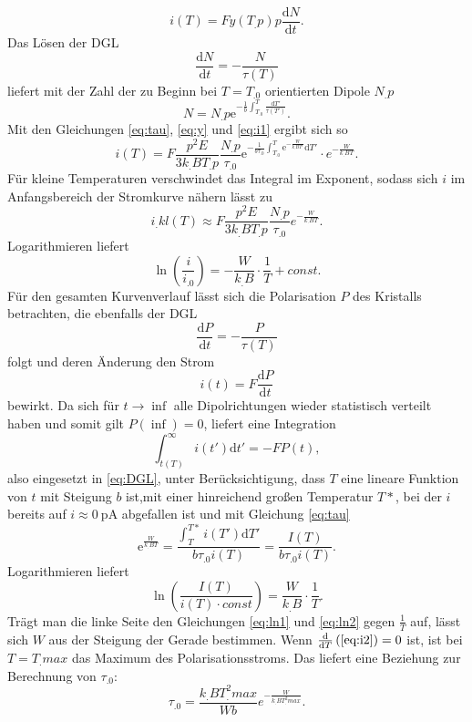 \begin{equation}
i(T)=F y(T_.p)p\frac{\mathrm{d}N}{\mathrm{d}t}\text{.}\label{eq:i1}
\end{equation}
Das Lösen der DGL
\[
\frac{\mathrm{d}N}{\mathrm{d}t}=-\frac{N}{\tau(T)}
\]
liefert mit der Zahl der zu Beginn bei $T=T_.0$ orientierten Dipole $N_.p$
\begin{equation}
N=N_.p\mathrm{e}^{-\frac{1}{b}\int_{T_.0}^T\frac{\mathrm{d}T'}{\tau(T')}}\text{.}\label{eq:N}
\end{equation}
Mit den Gleichungen \eqref{eq:tau}, \eqref{eq:y} und \eqref{eq:i1} ergibt sich so
\begin{equation}
i(T)=F\frac{p^2E}{3k_.BT_.p}\frac{N_.p}{\tau_.0}\mathrm{e}^{-\frac{1}{b\tau_.0}\int_{T_.0}^T\mathrm{e}^{-\frac{W}{k_.BT'}}\mathrm{d}T'}\cdot e^{-\frac{W}{k_.BT}}\text{.}\label{eq:i2}
\end{equation}
Für kleine Temperaturen verschwindet das Integral im Exponent, sodass sich $i$ im Anfangsbereich der Stromkurve nähern lässt zu
\begin{equation}
i_.{kl}(T)\approx F\frac{p^2E}{3k_.BT_.p}\frac{N_.p}{\tau_.0}e^{-\frac{W}{k_.BT}}\text{.}\label{eq:i_kl}
\end{equation}
Logarithmieren liefert 
\begin{equation}
\ln\left(\frac{i}{i_.0}\right)=-\frac{W}{k_.B}\cdot\frac{1}{T}+const\text{.}\label{eq:ln1}
\end{equation}
Für den gesamten Kurvenverlauf lässt sich die Polarisation $P$ des Kristalls betrachten, die ebenfalls der DGL
\begin{equation}
\frac{\mathrm{d}P}{\mathrm{d}t}=-\frac{P}{\tau(T)}\label{eq:DGL}
\end{equation}
folgt und deren Änderung den Strom
\[
i(t)=F\frac{\mathrm{d}P}{\mathrm{d}t}
\]
bewirkt. Da sich für $t\rightarrow\inf$ alle Dipolrichtungen wieder statistisch verteilt haben und somit gilt $P(\inf)=0$, liefert eine Integration
\[
\int_{t(T)}^{\infty}i(t')\mathrm{d}t'=-F P(t),
\]
also eingesetzt in \eqref{eq:DGL}, unter Berücksichtigung, dass $T$ eine lineare Funktion von $t$ mit Steigung $b$ ist,mit einer hinreichend großen Temperatur $T*$, bei der $i$ bereits auf $i\approx\SI{0}{\pico\ampere}$ abgefallen ist und mit Gleichung \eqref{eq:tau}
\begin{equation}
\mathrm{e}^{\frac{W}{k_.BT}}=\frac{\int_{T}^{T*}i(T')\mathrm{d}T'}{b\tau_.0 i(T)}=\frac{I(T)}{b\tau_.0 i(T)}\text{.}\label{eq:i3}
\end{equation}
Logarithmieren liefert
\begin{equation}
\ln\left(\frac{I(T)}{i(T)\cdot const}\right)=\frac{W}{k_.B}\cdot\frac{1}{T}\text{.}\label{eq:ln2}
\end{equation}
Trägt man die linke Seite den Gleichungen \eqref{eq:ln1} und \eqref{eq:ln2} gegen $\frac{1}{T}$ auf, lässt sich $W$ aus der Steigung der Gerade bestimmen.
Wenn $\frac{\mathrm{d}}{\mathrm{d}T}\left(\eqref{eq:i2}\right)=0$ ist, ist bei $T=T_.max$ das Maximum des Polarisationsstroms.
Das liefert eine Beziehung zur Berechnung von $\tau_.0$:
\begin{equation}
\tau_.0=\frac{k_.BT^2_.{max}}{W b}e^{-\frac{W}{k_.BT^2_.{max}}}\text{.}\label{eq:tau0}
\end{equation}


